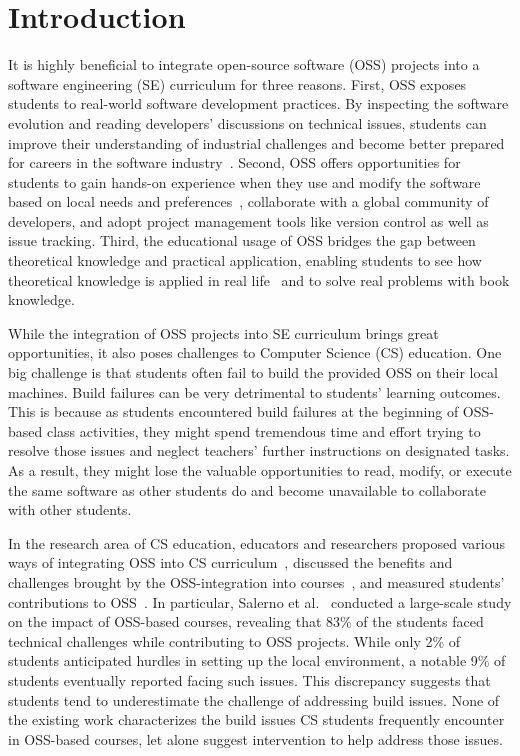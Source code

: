 \section{Introduction}
It is highly beneficial to integrate open-source software (OSS) projects into a software engineering (SE) curriculum for three reasons. First, OSS exposes students to real-world software development practices. By inspecting the software evolution and reading developers' discussions on technical issues, students can improve their understanding of industrial challenges and become better prepared for careers in the software industry~\cite{Gokhale2012}. Second, OSS offers opportunities for students to gain hands-on  experience when they use and modify the software based on local needs and preferences~\cite{Kotwani2011}, collaborate with a global community of developers, and adopt project management tools like version control as well as issue tracking. Third, the educational usage of OSS bridges the gap between theoretical knowledge and practical application, enabling students to see how theoretical knowledge is applied in real life~\cite{Pinto2017} and to solve real problems with book knowledge.

While the integration of OSS projects into SE curriculum brings great opportunities, it also poses challenges to Computer Science (CS) education. One big challenge is that students often fail to build the provided OSS on their local machines. Build failures can be very detrimental to students' learning outcomes. This is because as students encountered build failures at the beginning of OSS-based class activities, they might spend tremendous time and effort trying to resolve those issues and neglect teachers' further instructions on designated tasks. As a result, they might lose the valuable opportunities to read, modify, or execute the same software as other students do and become unavailable to collaborate with other students. 

In the research area of CS education, educators and researchers proposed various ways of integrating OSS into CS curriculum~\cite{nascimento2015open,Pinto2017,Kotwani2011,Gokhale2012,choi2021open}, discussed the benefits and challenges brought by the OSS-integration into courses~\cite{Salerno_de2023}, and measured students' contributions to OSS~\cite{Fang_Endres_Zimmermann_Ford_Weimer_Leach_Huang_2023}. In particular, Salerno et al.~\cite{Salerno_de2023} conducted a large-scale study on the impact of OSS-based courses, revealing that 83\% of the students faced technical challenges while contributing to OSS projects. While only 2\% of students anticipated hurdles in setting up the local environment, a notable 9\% of students eventually reported facing such issues. This discrepancy suggests that students tend to underestimate the challenge of addressing build issues. None of the existing work characterizes the build issues CS students frequently encounter in OSS-based courses, let alone suggest intervention to help address those issues.

